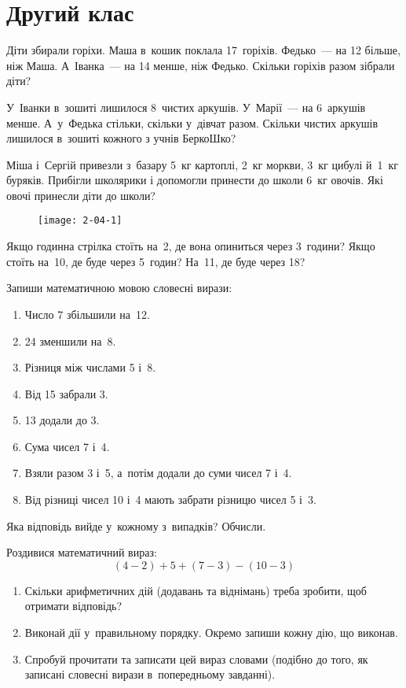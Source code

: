 \chapter{Другий клас}

\problem
Діти збирали горіхи. Маша в~кошик поклала 17~горіхів.
Федько~--- на 12 більше, ніж Маша. А~Іванка~--- на 14 менше, ніж Федько.
Скільки горіхів разом зібрали діти?


\problem
У~Іванки в~зошиті лишилося 8~чистих аркушів.
У~Марії~--- на 6~аркушів менше.
А~у~Федька стільки, скільки у~дівчат разом.
Скільки чистих аркушів лишилося в~зошиті кожного з учнів БеркоШко?


\problem
Міша і~Сергій привезли з~базару 5~кг картоплі, 2~кг моркви,
3~кг цибулі й~1~кг буряків.
Прибігли школярики і допомогли принести до школи 6~кг овочів.
Які овочі принесли діти до школи?


\problem
{}

\begin{figure}[ht]
  \centering
  \texttt{[image: 2-04-1]}
\end{figure}

Якщо годинна стрілка стоїть на~2, де вона опиниться через 3~години?
Якщо стоїть на~10, де буде через 5~годин?
На~11, де буде через 18?


\problem
Запиши математичною мовою словесні вирази:
\begin{enumerate}
  \item Число 7 збільшили на~12.
  \item 24 зменшили на~8.
  \item Різниця між числами 5 і~8.
  \item Від 15 забрали 3.
  \item 13 додали до 3.
  \item Сума чисел 7 і~4.
  \item Взяли разом 3 і~5, а~потім додали до суми чисел 7 і~4.
  \item Від різниці чисел 10 і~4 мають забрати різницю чисел 5 і~3.
\end{enumerate}
Яка відповідь вийде у~кожному з~випадків? Обчисли.


\problem
Роздивися математичний вираз:
\[
  (4 - 2) + 5 + (7 - 3) - (10 - 3)
\]
\begin{enumerate}
  \item Скільки арифметичних дій (додавань та віднімань)
  треба зробити, щоб отримати відповідь?
  \item Виконай дії у~правильному порядку.
  Окремо запиши кожну дію, що виконав.
  \item Спробуй прочитати та записати цей вираз словами
  (подібно до того, як записані словесні вирази в~попередньому завданні).
\end{enumerate}


